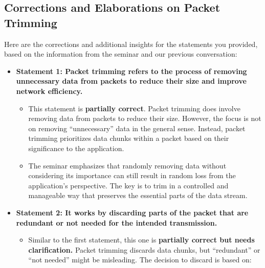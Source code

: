 \documentclass[
]{article}
\author{}
\date{}
\begin{document}
\subsection{Corrections and Elaborations on Packet
Trimming}\label{corrections-and-elaborations-on-packet-trimming}

Here are the corrections and additional insights for the statements you
provided, based on the information from the seminar and our previous
conversation:

\begin{itemize}
\item
  \textbf{Statement 1: Packet trimming refers to the process of removing
  unnecessary data from packets to reduce their size and improve network
  efficiency.}

  \begin{itemize}
  
  \item
    This statement is \textbf{partially correct}. Packet trimming does
    involve removing data from packets to reduce their size. However,
    the focus is not on removing ``unnecessary'' data in the general
    sense. Instead, packet trimming prioritizes data chunks within a
    packet based on their significance to the application.
  \item
    The seminar emphasizes that randomly removing data without
    considering its importance can still result in random loss from the
    application's perspective. The key is to trim in a controlled and
    manageable way that preserves the essential parts of the data
    stream.
  \end{itemize}
\item
  \textbf{Statement 2: It works by discarding parts of the packet that
  are redundant or not needed for the intended transmission.}

  \begin{itemize}
  
  \item
    Similar to the first statement, this one is \textbf{partially
    correct but needs clarification.} Packet trimming discards data
    chunks, but ``redundant'' or ``not needed'' might be misleading. The
    decision to discard is based on:

    \begin{itemize}
    

\end{itemize}
\end{itemize}
\end{itemize}
\end{document}
